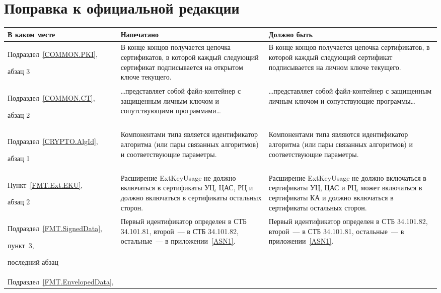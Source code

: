 \clearpage
\chapter*{\mbox{}\hfill Поправка к официальной редакции\hfill\mbox{}}

\mbox{}

{\small
\begin{center}
\begin{tabular}{|p{3cm}|p{6.3cm}|p{6.4cm}|}
\hline
В каком месте & Напечатано & Должно быть\\
\hline
\hline
Подраздел~\ref{COMMON.PKI},\par 
абзац 3
&
В конце концов получается цепочка сертификатов, в которой каждый следующий 
сертификат подписывается на открытом ключе текущего.
&
В конце концов получается цепочка сертификатов, в которой каждый следующий 
сертификат подписывается на личном ключе текущего.
\\
\hline
Подраздел~\ref{COMMON.CT},\par 
абзац 2
&
\ldots представляет собой файл-контейнер с защищенным личным 
ключом и сопутствующими программами\ldots
&
\ldots представляет собой файл-контейнер с защищенным личным 
ключом и сопутствующие программы\ldots
\\
\hline
Подраздел~\ref{CRYPTO.AlgId},\par 
абзац 1
&
Компонентами типа является идентификатор алгоритма (или пары 
связанных алгоритмов) и соответствующие параметры. 
&
Компонентами типа являются идентификатор алгоритма (или пары 
связанных алгоритмов) и соответствующие параметры. 
\\
\hline
Пункт~\ref{FMT.Ext.EKU},\par 
абзац 2
&
Расширение ExtKeyUsage не должно включаться в сертификаты УЦ, ЦАС, РЦ 
и должно включаться в сертификаты остальных сторон.
&
Расширение ExtKeyUsage не должно включаться в сертификаты УЦ, ЦАС и РЦ,
может включаться в сертификаты КА и должно включаться в сертификаты остальных 
сторон.
\\
\hline
Подраздел~\ref{FMT.SignedData},\par пункт~3,\par 
последний абзац 
&
Первый идентификатор определен в СТБ 34.101.81, второй~--- в СТБ 
34.101.82, остальные~--- в приложении~\ref{ASN1}.
&
Первый идентификатор определен в СТБ 34.101.82, второй~--- в СТБ 
34.101.81, остальные~--- в приложении~\ref{ASN1}.
\\
\hline
Подраздел~\ref{FMT.EnvelopedData},\par 

\end{tabular}
\end{center}}
